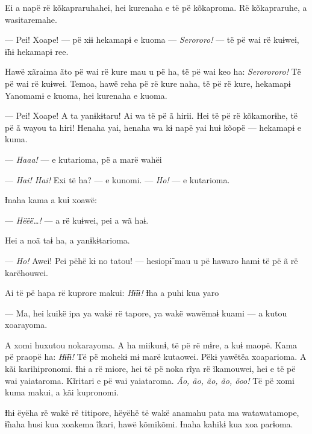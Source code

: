 
Ei a napë rë kõkapraruhahei, hei kurenaha e të pë kõkaproma. Rë
kõkapraruhe, a wasitaremahe. 

--- Pei! Xoape! --- pë xɨɨ hekamapɨ e kuoma --- \textit{Serororo!} --- të pë wai
rë kuɨwei, ɨ̃hɨ hekamapɨ ree. 

Hawë xãraima ãto pë wai rë kure mau u pë ha, të pë wai keo ha:
\textit{Serorororo!} Të pë wai rë kuɨwei. Temoa, hawë reha pë rë kure naha, të pë
rë kure, hekamapɨ Yanomamɨ e kuoma, hei kurenaha e kuoma. 

--- Pei! Xoape! A ta yanɨkɨtaru! Ai wa të pë ã hirii. Hei të pë rë
kõkamorɨhe, të pë ã wayou ta hiri! Henaha yai, henaha wa kɨ napë yai huɨ
kõopë --- hekamapɨ e kuma. 

--- \textit{Haaa!} --- e kutarioma, pë a marë wahëi 

--- \textit{Hai! Hai!} Exi të ha? --- e kunomi. --- \textit{Ho!} --- e kutarioma. 

Ɨnaha kama a kuɨ xoawë:

--- \textit{Hëëë\ldots{}!} --- a rë kuɨwei, pei a wã haɨ. 

Hei a noã taɨ ha, a yanɨkɨtarioma. 

--- \textit{Ho!} Awei! Pei pëhë kɨ no tatou! --- hesiopɨ̃ mau u pë hawaro hamɨ të
pë ã rë karëhouwei. 


Ai të pë hapa rë kuprore makui: \textit{Hɨ̃ɨɨ!} Ɨha a puhi kua yaro 

--- Ma, hei kuikë ipa ya wakë rë tapore, ya wakë wawëmaɨ kuami --- a
kutou xoarayoma. 

A xomi huxutou nokarayoma. A ha miikunɨ, të pë rë mɨre, a kuɨ maopë.
Kama pë praopë ha: \textit{Hɨ̃ɨɨ! }Të pë mohekɨ mɨ marë kutaowei. Pëkɨ yawëtëa
xoaparioma. A kãi karihipronomi. Ɨhɨ a rë miore, hei të pë noka rĩya rë
ĩkamouwei, hei e të pë wai yaiataroma. Kĩritari e pë wai yaiataroma. \textit{Ão,
ão, ão, ão, õoo!} Të pë xomi kuma makui, a kãi kupronomi. 

Ɨhɨ ëyëha rë wakë rë titipore, hëyëhë të wakë anamahu pata ma
watawatamope, ɨ̃naha husi kua xoakema ĩkari, hawë kõmikõmi. Ɨnaha kahikɨ
kua xoa parɨoma. 

